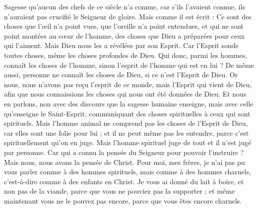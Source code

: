 \begin{multicols}{2}
Sagesse qu'aucun des chefs de ce siècle n'a connue, car s'ils l'avaient connue, ils n'auraient pas crucifié le Seigneur de gloire.
Mais comme il est écrit : Ce sont des choses que l'œil n'a point vues, que l'oreille n'a point entendues, et qui ne sont point montées au cœur de l'homme, des choses que Dieu a préparées pour ceux qui l'aiment.
Mais Dieu nous les a révélées par son Esprit. Car l'Esprit sonde toutes choses, même les choses profondes de Dieu.
Qui donc, parmi les hommes, connaît les choses de l'homme, sinon l'esprit de l'homme qui est en lui ? De même aussi, personne ne connaît les choses de Dieu, si ce n'est l'Esprit de Dieu.
Or nous, nous n'avons pas reçu l'esprit de ce monde, mais l'Esprit qui vient de Dieu, afin que nous connaissions les choses qui nous ont été données de Dieu.
Et nous en parlons, non avec des discours que la sagesse humaine enseigne, mais avec celle qu'enseigne le Saint-Esprit, communiquant des choses spirituelles à ceux qui sont spirituels.
Mais l'homme animal ne comprend pas les choses de l'Esprit de Dieu, car elles sont une folie pour lui ; et il ne peut même pas les entendre, parce c'est spirituellement qu'on en juge.
Mais l'homme spirituel juge de tout et il n'est jugé par personne.
Car qui a connu la pensée du Seigneur pour pouvoir l'instruire ? Mais nous, nous avons la pensée de Christ.
\VerseOne{}Pour moi, mes frères, je n'ai pas pu vous parler comme à des hommes spirituels, mais comme à des hommes charnels, c'est-à-dire comme à des enfants en Christ.
Je vous ai donné du lait à boire, et non pas de la viande, parce que vous ne pouviez pas la supporter ; et même maintenant vous ne le pouvez pas encore, parce que vous êtes encore charnels.

\end{multicols}
